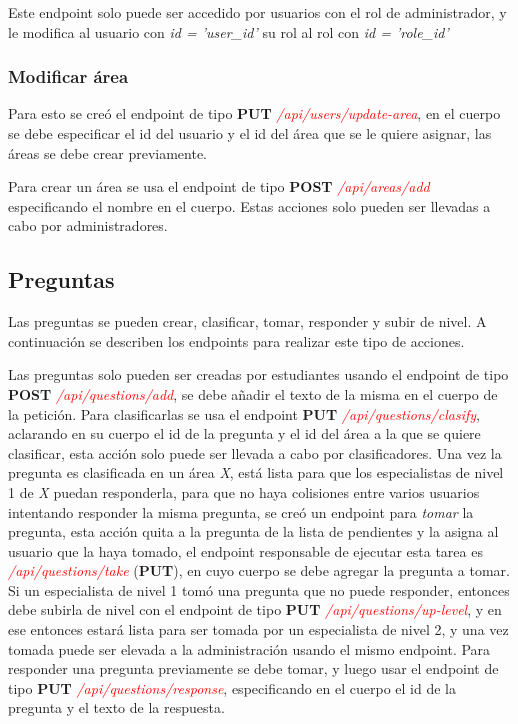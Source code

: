 Este endpoint solo puede ser accedido por usuarios con el rol de administrador, y le modifica al usuario con \textit{id = 'user\_id'} su rol al rol con \textit{id = 'role\_id'}

\subsubsection{Modificar área}

Para esto se creó el endpoint de tipo \textbf{PUT} \textit{\textcolor{red}{/api/users/update-area}}, en el cuerpo se debe especificar el id del usuario y el id del área que se le quiere asignar, las áreas se debe crear previamente.
\newline

Para crear un área se usa el endpoint de tipo \textbf{POST} \textit{\textcolor{red}{/api/areas/add}} especificando el nombre en el cuerpo. Estas acciones solo pueden ser llevadas a cabo por administradores.

\subsection{Preguntas}

Las preguntas se pueden crear, clasificar, tomar, responder y subir de nivel. A continuación se describen los endpoints para realizar este tipo de acciones.
\newline

Las preguntas solo pueden ser creadas por estudiantes usando el endpoint de tipo \textbf{POST} \textit{\textcolor{red}{/api/questions/add}}, se debe añadir el texto de la misma en el cuerpo de la petición. Para clasificarlas se usa el endpoint \textbf{PUT} \textit{\textcolor{red}{/api/questions/clasify}}, aclarando en su cuerpo el id de la pregunta y el id del área a la que se quiere clasificar, esta acción solo puede ser llevada a cabo por clasificadores. Una vez la pregunta es clasificada en un área \textit{X}, está lista para que los especialistas de nivel 1 de \textit{X} puedan responderla, para que no haya colisiones entre varios usuarios intentando responder la misma pregunta, se creó un endpoint para \textit{tomar} la pregunta, esta acción quita a la pregunta de la lista de pendientes y la asigna al usuario que la haya tomado, el endpoint responsable de ejecutar esta tarea es \textit{\textcolor{red}{/api/questions/take}} (\textbf{PUT}), en cuyo cuerpo se debe agregar la pregunta a tomar. Si un especialista de nivel 1 tomó una pregunta que no puede responder, entonces debe subirla de nivel con el endpoint de tipo \textbf{PUT} \textit{\textcolor{red}{/api/questions/up-level}}, y en ese entonces estará lista para ser tomada por un especialista de nivel 2, y una vez tomada puede ser elevada a la administración usando el mismo endpoint. Para responder una pregunta previamente se debe tomar, y luego usar el endpoint de tipo \textbf{PUT} \textit{\textcolor{red}{/api/questions/response}}, especificando en el cuerpo el id de la pregunta y el texto de la respuesta.

